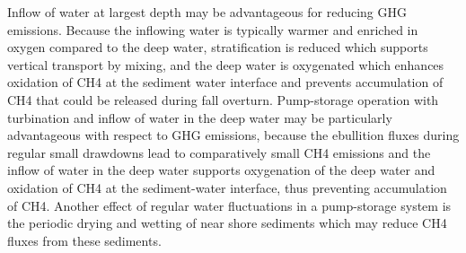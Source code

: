 Inflow of water at largest depth may be advantageous for reducing GHG emissions. Because the inflowing water is typically warmer and enriched in oxygen compared to the deep water, stratification is reduced which supports vertical transport by mixing, and the deep water is oxygenated which enhances oxidation of CH4 at the sediment water interface and prevents accumulation of CH4 that could be released during fall overturn.  
Pump-storage operation with turbination and inflow of water in the deep water may be particularly advantageous with respect to GHG emissions, because the ebullition fluxes during regular small drawdowns lead to comparatively small CH4 emissions and the inflow of water in the deep water supports oxygenation of the deep water and oxidation of CH4 at the sediment-water interface, thus preventing accumulation of CH4. Another effect of regular water fluctuations in a pump-storage system is the periodic drying and wetting of near shore sediments which may reduce CH4 fluxes from these sediments.
